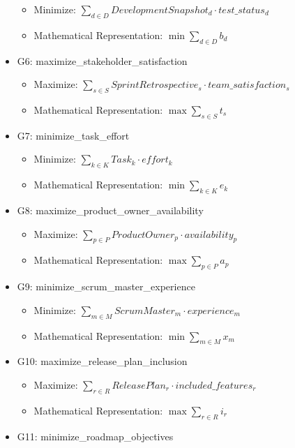 \documentclass{article}
\begin{document}
\begin{itemize}
\begin{itemize}
            \item Minimize: $\sum_{d \in D} DevelopmentSnapshot_{d} \cdot test\_status_{d}$
            \item Mathematical Representation: $\min \sum_{d \in D} b_{d}$
        \end{itemize}
    \item G6: maximize\_stakeholder\_satisfaction
        \begin{itemize}
            \item Maximize: $\sum_{s \in S} SprintRetrospective_{s} \cdot team\_satisfaction_{s}$
            \item Mathematical Representation: $\max \sum_{s \in S} t_{s}$
        \end{itemize}
    \item G7: minimize\_task\_effort
        \begin{itemize}
            \item Minimize: $\sum_{k \in K} Task_{k} \cdot effort_{k}$
            \item Mathematical Representation: $\min \sum_{k \in K} e_{k}$
        \end{itemize}
    \item G8: maximize\_product\_owner\_availability
        \begin{itemize}
            \item Maximize: $\sum_{p \in P} ProductOwner_{p} \cdot availability_{p}$
            \item Mathematical Representation: $\max \sum_{p \in P} a_{p}$
        \end{itemize}
    \item G9: minimize\_scrum\_master\_experience
        \begin{itemize}
            \item Minimize: $\sum_{m \in M} ScrumMaster_{m} \cdot experience_{m}$
            \item Mathematical Representation: $\min \sum_{m \in M} x_{m}$
        \end{itemize}
    \item G10: maximize\_release\_plan\_inclusion
        \begin{itemize}
            \item Maximize: $\sum_{r \in R} ReleasePlan_{r} \cdot included\_features_{r}$
            \item Mathematical Representation: $\max \sum_{r \in R} i_{r}$
        \end{itemize}
    \item G11: minimize\_roadmap\_objectives

\end{itemize}
\end{document}
